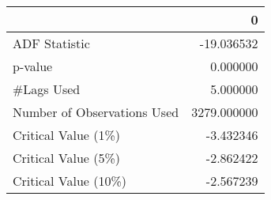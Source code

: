 \begin{tabular}{lr}
\toprule
{} &            0 \\
\midrule
ADF Statistic               &   -19.036532 \\
p-value                     &     0.000000 \\
\#Lags Used                  &     5.000000 \\
Number of Observations Used &  3279.000000 \\
Critical Value (1\%)         &    -3.432346 \\
Critical Value (5\%)         &    -2.862422 \\
Critical Value (10\%)        &    -2.567239 \\
\bottomrule
\end{tabular}
